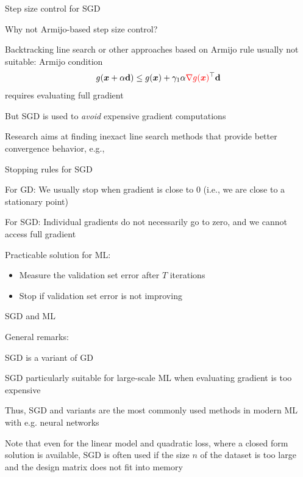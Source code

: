 \documentclass[11pt,compress,t,notes=noshow, xcolor=table]{beamer}
\begin{document}
\begin{framev}{Step size control for SGD}
\begin{blocki}{Why not Armijo-based step size control?}
\item Backtracking line search or other approaches based on Armijo rule usually not suitable: Armijo condition
$$
g(\bm{x} + \alpha \mathbf{d}) \le g(\bm{x}) + \gamma_1 \alpha \textcolor{red}{\nabla g(\bm{x})}^\top \mathbf{d}
$$
requires evaluating full gradient
\item But SGD is used to \emph{avoid} expensive gradient computations
\item Research aims at finding inexact line search methods that provide better convergence behavior, e.g., 
\end{blocki}
\end{framev}

\begin{framei}{Stopping rules for SGD}
\item For GD: We usually stop when gradient is close to $0$ (i.e., we are close to a stationary point)
\item For SGD: Individual gradients do not necessarily go to zero, and we cannot access full gradient
\item Practicable solution for ML:
\begin{itemize}
\item Measure the validation set error after $T$ iterations
\item Stop if validation set error is not improving
\end{itemize}
\end{framei}

\begin{framev}[fs=small]{SGD and ML}
\begin{blocki}{General remarks:}
\item SGD is a variant of GD
\item SGD particularly suitable for large-scale ML when evaluating gradient is too expensive
\item Thus, SGD and variants are the most commonly used methods in modern ML with e.g. neural networks
\item Note that even for the linear model and quadratic loss, where a closed form solution is available, SGD is often used if the size $n$ of the dataset is too large and the design matrix does not fit into memory
\end{blocki}
\end{framev}


\endlecture
\end{document}
